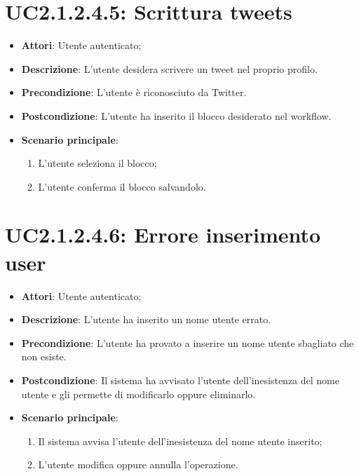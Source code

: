 \section{UC2.1.2.4.5: Scrittura tweets}
\label{UC2.1.2.4.5}
\begin{itemize}
	\item \textbf{Attori}: Utente autenticato;
	\item \textbf{Descrizione}: L'utente desidera scrivere un tweet nel proprio profilo.
	\item \textbf{Precondizione}: L'utente è riconosciuto da Twitter.
	\item \textbf{Postcondizione}: L'utente ha inserito il blocco desiderato nel workflow.
	\item \textbf{Scenario principale}:
	\begin{enumerate}\item L'utente seleziona il blocco; \item  L'utente conferma il blocco salvandolo.\end{enumerate}
\end{itemize}

\section{UC2.1.2.4.6: Errore inserimento user}
\label{UC2.1.2.4.6}
\begin{itemize}
	\item \textbf{Attori}: Utente autenticato;
	\item \textbf{Descrizione}: L'utente ha inserito un nome utente errato.
	\item \textbf{Precondizione}: L'utente ha provato a inserire un nome utente sbagliato che non esiste.
	\item \textbf{Postcondizione}: Il sistema ha avvisato l'utente dell'inesistenza del nome utente e gli permette di modificarlo oppure eliminarlo.
	\item \textbf{Scenario principale}:
	\begin{enumerate} \item Il sistema avvisa l'utente dell'inesistenza del nome utente inserito;  \item  L'utente modifica oppure annulla l'operazione.\end{enumerate}
\end{itemize}

